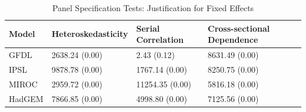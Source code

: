 \begin{table}[ht]
\centering
\caption{Panel Specification Tests: Justification for Fixed Effects} 
\label{tab:error_quality_tests}
\begin{tabular}{llll}
  \hline
Model & Heteroskedasticity & Serial Correlation & Cross-sectional Dependence \\ 
  \hline
GFDL & 2638.24 (0.00) & 2.43 (0.12) & 8631.49 (0.00) \\ 
  IPSL & 9878.78 (0.00) & 1767.14 (0.00) & 8250.75 (0.00) \\ 
  MIROC & 2959.72 (0.00) & 11254.35 (0.00) & 5816.18 (0.00) \\ 
  HadGEM & 7866.85 (0.00) & 4998.80 (0.00) & 7125.56 (0.00) \\ 
   \hline
\end{tabular}
\end{table}
